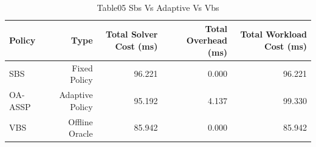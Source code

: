 \begin{table}[htbp]
\centering
\caption{Table05 Sbs Vs Adaptive Vs Vbs}
\begin{tabular}{lrrrr}
\hline
Policy & Type & Total Solver Cost (ms) & Total Overhead (ms) & Total Workload Cost (ms) \\
\hline
SBS & Fixed Policy & 96.221 & 0.000 & 96.221 \\
OA-ASSP & Adaptive Policy & 95.192 & 4.137 & 99.330 \\
VBS & Offline Oracle & 85.942 & 0.000 & 85.942 \\
\hline
\end{tabular}
\end{table}
